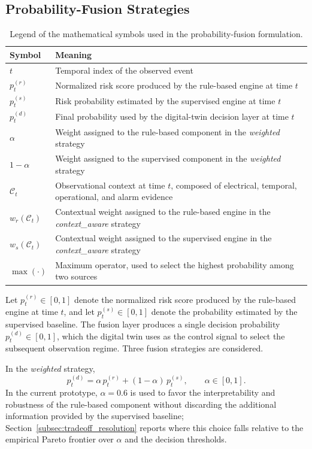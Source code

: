 \documentclass{ieeeaccess}
\begin{document}
\subsection{Probability-Fusion Strategies}
\label{subsec:fusao}
\begin{table}[ht]
\centering
\caption{Legend of the mathematical symbols used in the probability-fusion formulation.}
\label{tab:fusion_symbols}
\begin{tabular}{p{1.3cm} p{6.38cm}}
\hline
\textbf{Symbol} & \textbf{Meaning} \\
\hline
$t$ & Temporal index of the observed event \\
$p_t^{(r)}$ & Normalized risk score produced by the rule-based engine at time $t$ \\
$p_t^{(s)}$ & Risk probability estimated by the supervised engine at time $t$ \\
$p_t^{(d)}$ & Final probability used by the digital-twin decision layer at time $t$ \\
$\alpha$ & Weight assigned to the rule-based component in the \textit{weighted} strategy \\
$1-\alpha$ & Weight assigned to the supervised component in the \textit{weighted} strategy \\
$\mathcal{C}_t$ & Observational context at time $t$, composed of electrical, temporal, operational, and alarm evidence \\
$w_r(\mathcal{C}_t)$ & Contextual weight assigned to the rule-based engine in the \textit{context\_aware} strategy \\
$w_s(\mathcal{C}_t)$ & Contextual weight assigned to the supervised engine in the \textit{context\_aware} strategy \\
$\max(\cdot)$ & Maximum operator, used to select the highest probability among two sources \\
\hline
\end{tabular}
\end{table}

Let $p_t^{(r)} \in [0,1]$ denote the normalized risk score produced by the rule-based engine at time $t$, and let $p_t^{(s)} \in [0,1]$ denote the probability estimated by the supervised baseline. The fusion layer produces a single decision probability $p_t^{(d)} \in [0,1]$, which the digital twin uses as the control signal to select the subsequent observation regime. Three fusion strategies are considered.

In the \textit{weighted} strategy,
\begin{equation}
p_t^{(d)} = \alpha\, p_t^{(r)} + (1-\alpha)\, p_t^{(s)}, \qquad \alpha \in [0,1].
\label{eq:weighted_fusion}
\end{equation}
In the current prototype, $\alpha = 0.6$ is used to favor the interpretability and robustness of the rule-based component without discarding the additional information provided by the supervised baseline; Section~\ref{subsec:tradeoff_resolution} reports where this choice falls relative to the empirical Pareto frontier over $\alpha$ and the decision thresholds.
\end{document}
